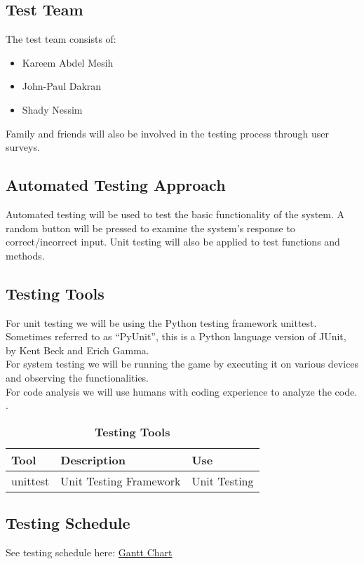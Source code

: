 \documentclass[12pt, titlepage]{article}
\begin{document}
\subsection{Test Team}
The test team consists of:
\begin{itemize}
  \item Kareem Abdel Mesih
  \item John-Paul Dakran
  \item Shady Nessim
\end{itemize}
Family and friends will also be involved in the testing process through user surveys.

\subsection{Automated Testing Approach}
Automated testing will be used to test the basic functionality of the system. A random button will be pressed to examine the system's response to correct/incorrect input. Unit testing will also be applied to test functions and methods.

\subsection{Testing Tools}
For unit testing we will be using the Python testing framework unittest. Sometimes referred to as “PyUnit”, this is a Python language version of JUnit, by Kent Beck and Erich Gamma. \\
For system testing we will be running the game by executing it on various devices and observing the functionalities. \\
For code analysis we will use humans with coding experience to analyze the code.
.
\begin{table}[h]
\caption{\bf Testing Tools}
\begin{tabularx}{\textwidth}{p{3cm}p{6cm}X}
\toprule {\bf Tool} & {\bf Description} & {\bf Use}\\
\midrule
unittest & Unit Testing Framework & Unit Testing \\
\bottomrule
\end{tabularx}
\end{table}

\subsection{Testing Schedule}
\label{subsec:sched}
See testing schedule here:
\href{run:GanttChart.gan} {Gantt Chart}\\
\end{document}
